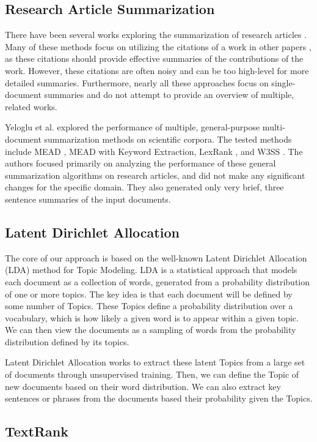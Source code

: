 \documentclass[conference]{sig-alternate-05-2015}
\begin{document}
\subsection{Research Article Summarization}
There have been several works exploring the summarization of research articles \cite{citsum, citnetsum, impactsum}. 
Many of these methods focus on utilizing the citations of a work in other papers \cite{citsum, citnetsum}, as these citations should provide effective summaries of the contributions of the work. 
However, these citations are often noisy and can be too high-level for more detailed summaries. 
Furthermore, nearly all these approaches focus on single-document summaries and do not attempt to provide an overview of multiple, related works.

Yeloglu et al. \cite{multisum} explored the performance of multiple, general-purpose multi-document summarization methods on scientific corpora. The tested methods include MEAD \cite{mead}, MEAD with Keyword Extraction, LexRank \cite{lexrank}, and W3SS \cite{w3ss}. The authors focused primarily on analyzing the performance of these general summarization algorithms on research articles, and did not make any significant changes for the specific domain. They also generated only very brief, three sentence summaries of the input documents. 

\subsection{Latent Dirichlet Allocation}
The core of our approach is based on the well-known Latent Dirichlet Allocation (LDA) \cite{lda} method for Topic Modeling.
LDA is a statistical approach that models each document as a collection of words, generated from a probability distribution of one or more topics.
The key idea is that each document will be defined by some number of Topics.
These Topics define a probability distribution over a vocabulary, which is how likely a given word is to appear within a given topic.
We can then view the documents as a sampling of words from the probability distribution defined by its topics. 

Latent Dirichlet Allocation works to extract these latent Topics from a large set of documents through unsupervised training. 
Then, we can define the Topic of new documents based on their word distribution. 
We can also extract key sentences or phrases from the documents based their probability given the Topics. 

\subsection{TextRank}
\end{document}
